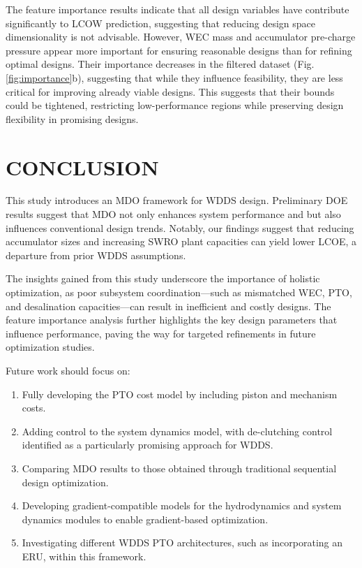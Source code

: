 \documentclass[twocolumn,10pt]{asme2e}
\begin{document}
The feature importance results indicate that all design variables have contribute significantly to LCOW prediction, suggesting that reducing design space dimensionality is not advisable. However, WEC mass and accumulator pre-charge pressure appear more important for ensuring reasonable designs than for refining optimal designs. Their importance decreases in the filtered dataset (Fig. \ref{fig:importance}b), suggesting that while they influence feasibility, they are less critical for improving already viable designs. This suggests that their bounds could be tightened, restricting low-performance regions while preserving design flexibility in promising designs. 

\section{CONCLUSION}
This study introduces an MDO framework for WDDS design. Preliminary DOE results suggest that MDO not only enhances system performance and but also influences  conventional design trends. Notably, our findings suggest that reducing accumulator sizes and increasing SWRO plant capacities can yield lower LCOE, a departure from prior WDDS assumptions.

The insights gained from this study underscore the importance of holistic optimization, as poor subsystem coordination---such as mismatched WEC, PTO, and desalination capacities---can result in inefficient and costly designs. The feature importance analysis further highlights the key design parameters that influence performance, paving the way for targeted refinements in future optimization studies.

Future work should focus on:
\begin{enumerate}
    \item Fully developing the PTO cost model by including piston and mechanism costs.
    \item Adding control to the system dynamics model, with de-clutching control \cite{Ringwood2014} identified as a particularly promising approach for WDDS.
    \item Comparing MDO results to those obtained through traditional sequential design optimization.
    \item Developing gradient-compatible models for the hydrodynamics and system dynamics modules to enable gradient-based optimization.
    \item Investigating different WDDS PTO architectures, such as incorporating an ERU, within this framework.
\end{enumerate}
\end{document}
